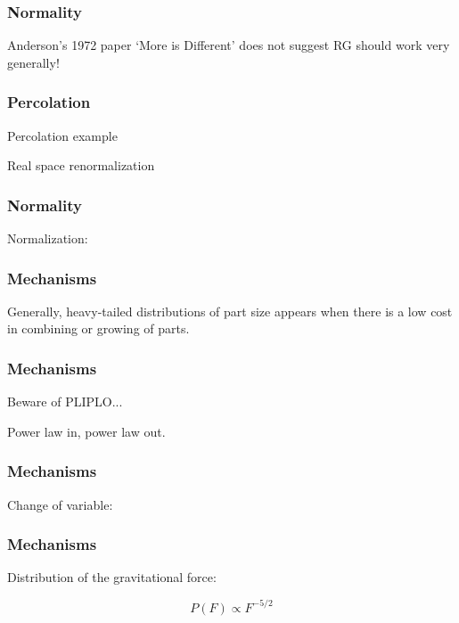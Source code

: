 \begin{frame}
  \frametitle{Normality}

Anderson's 1972 paper `More is Different'
does not suggest RG should work 
very generally!


\end{frame}

\begin{frame}
  \frametitle{Percolation}

Percolation example

Real space renormalization

\end{frame}

\begin{frame}
  \frametitle{Normality}

Normalization:





\end{frame}

\begin{frame}
  \frametitle{Mechanisms}

Generally, heavy-tailed distributions of
part size appears when there is a low cost in combining or growing
of parts.


\end{frame}

\begin{frame}
  \frametitle{Mechanisms}

Beware of PLIPLO...

Power law in, power law out.

\end{frame}

\begin{frame}
  \frametitle{Mechanisms}

Change of variable:

\end{frame}

\begin{frame}
  \frametitle{Mechanisms}

Distribution of the gravitational force:

$$ P(F) \propto F^{-5/2} $$


\end{frame}

